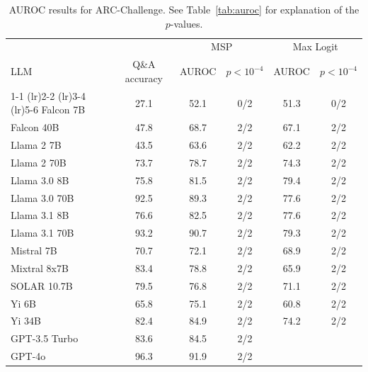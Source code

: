 \begin{table}[h]
\caption{AUROC results for ARC-Challenge. See Table~\ref{tab:auroc} for explanation of the $p$-values.}
\label{tab:auroc_max}
\centering
\begin{tabular}{lccccc}
\toprule
& & \multicolumn{2}{c}{MSP} & \multicolumn{2}{c}{Max Logit} \\ 
LLM & Q\&A accuracy & AUROC & $p < 10^{-4}$ & AUROC & $p < 10^{-4}$ \\ 
\cmidrule(lr){1-1} \cmidrule(lr){2-2} \cmidrule(lr){3-4} \cmidrule(lr){5-6} 
Falcon 7B & 27.1 & 52.1 & 0/2 & 51.3 & 0/2\\
Falcon 40B & 47.8 & 68.7 & 2/2 & 67.1 & 2/2\\
Llama 2 7B & 43.5 & 63.6 & 2/2 & 62.2 & 2/2\\
Llama 2 70B & 73.7 & 78.7 & 2/2 & 74.3 & 2/2\\
Llama 3.0 8B & 75.8 & 81.5 & 2/2 & 79.4 & 2/2\\
Llama 3.0 70B & 92.5 & 89.3 & 2/2 & 77.6 & 2/2\\
Llama 3.1 8B & 76.6 & 82.5 & 2/2 & 77.6 & 2/2\\
Llama 3.1 70B & 93.2 & 90.7 & 2/2 & 79.3 & 2/2\\
Mistral 7B & 70.7 & 72.1 & 2/2 & 68.9 & 2/2\\
Mixtral 8x7B & 83.4 & 78.8 & 2/2 & 65.9 & 2/2\\
SOLAR 10.7B & 79.5 & 76.8 & 2/2 & 71.1 & 2/2\\
Yi 6B & 65.8 & 75.1 & 2/2 & 60.8 & 2/2\\
Yi 34B & 82.4 & 84.9 & 2/2 & 74.2 & 2/2\\
GPT-3.5 Turbo & 83.6 & 84.5 & 2/2 &  & \\
GPT-4o & 96.3 & 91.9 & 2/2 &  &\\
\bottomrule
\end{tabular}
\end{table}
